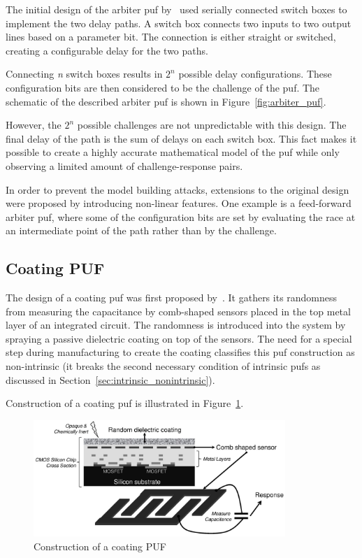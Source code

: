 The initial design of the arbiter \gls{puf} by~\cite{Lee2004} used serially connected switch boxes to implement the two delay paths. A switch box connects two inputs to two output lines based on a parameter bit. The connection is either straight or switched, creating a configurable delay for the two paths.

Connecting \emph{n} switch boxes results in $2^n$ possible delay configurations. These configuration bits are then considered to be the challenge of the \gls{puf}. The schematic of the described arbiter \gls{puf} is shown in Figure~\ref{fig:arbiter_puf}.

However, the $2^n$ possible challenges are not unpredictable with this design. The final delay of the path is the sum of delays on each switch box. This fact makes it possible to create a highly accurate mathematical model of the \gls{puf} while only observing a limited amount of challenge-response pairs.~\cite{Lee2004}

In order to prevent the model building attacks, extensions to the original design were proposed by introducing non-linear features. One example is a feed-forward arbiter \gls{puf}, where some of the configuration bits are set by evaluating the race at an intermediate point of the path rather than by the challenge.~\cite{Lee2005}

\subsection{Coating PUF}

The design of a coating \gls{puf} was first proposed by~\cite{Tuyls2006}. It gathers its randomness from measuring the capacitance by comb-shaped sensors placed in the top metal layer of an integrated circuit. The randomness is introduced into the system by spraying a passive dielectric coating on top of the sensors. The need for a special step during manufacturing to create the coating classifies this \gls{puf} construction as non-intrinsic (it breaks the second necessary condition of intrinsic \glspl{puf} as discussed in Section~\ref{sec:intrinsic_nonintrinsic}).~\cite{Maes2010}

Construction of a coating \gls{puf} is illustrated in Figure~\ref{fig:coating_puf}.

\begin{figure}[h!]
    \centering
    \captionsetup{justification=centering,margin=0.5cm}
    \includegraphics[width=0.85\textwidth]{images/coating_puf.png}
    \caption[Construction of a coating PUF]{Construction of a coating PUF~\cite{Maes2012}}
    \label{fig:coating_puf}
\end{figure}

